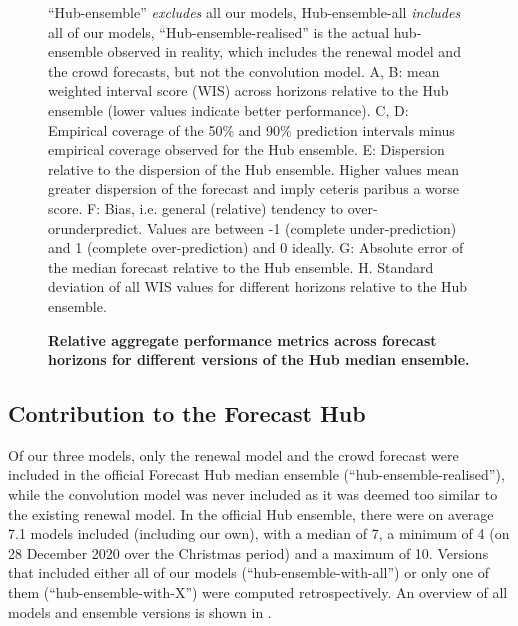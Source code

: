 \documentclass[10pt,letterpaper]{article}
\begin{document}
\begin{figure}[H]
\caption{\bf{Relative aggregate performance metrics across forecast horizons for different versions of the Hub median ensemble.}}
“Hub-ensemble” \textit{excludes} all our models, Hub-ensemble-all \textit{includes} all of our models, “Hub-ensemble-realised” is the actual hub-ensemble observed in reality, which includes the renewal model and the crowd forecasts, but not the convolution model. A, B: mean weighted interval score (WIS) across horizons relative to the Hub ensemble (lower values indicate better performance). C, D: Empirical coverage of the 50\% and 90\% prediction intervals minus empirical coverage observed for the Hub ensemble. E: Dispersion relative to the dispersion of the Hub ensemble. Higher values mean greater dispersion of the forecast and imply ceteris paribus a worse score. F: Bias, i.e. general (relative) tendency to over- orunderpredict. Values are between -1 (complete under-prediction) and 1 (complete over-prediction) and 0 ideally. G: Absolute error of the median forecast relative to the Hub ensemble. H. Standard deviation of all WIS values for different horizons relative to the Hub ensemble.
\label{fig:agg-performance-ensemble-rel}
\end{figure}

\hypertarget{contribution-to-the-forecast-hub}{%
\subsection{Contribution to the Forecast
Hub}\label{contribution-to-the-forecast-hub}}

\label{contributions-hub}

Of our three models, only the renewal model and the crowd forecast were
included in the official Forecast Hub median ensemble
(``hub-ensemble-realised''), while the convolution model was never
included as it was deemed too similar to the existing renewal model. In
the official Hub ensemble, there were on average 7.1 models included
(including our own), with a median of 7, a minimum of 4 (on 28 December
2020 over the Christmas period) and a maximum of 10. Versions that
included either all of our models (``hub-ensemble-with-all'') or only
one of them (``hub-ensemble-with-X'') were computed retrospectively. An
overview of all models and ensemble versions is shown in
.
\end{document}
